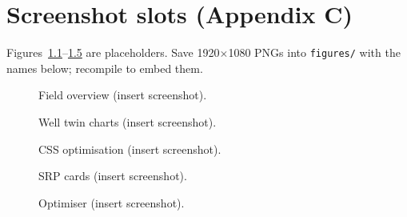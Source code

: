 \documentclass[12pt,a4paper]{report}
\begin{document}
\chapter{Screenshot slots (Appendix C)}
Figures~\ref{fig:map}--\ref{fig:pareto} are placeholders. Save 1920$\times$1080
PNGs into \texttt{figures/} with the names below; recompile to embed them.
\begin{figure}[h]\centering
{}
\caption{Field overview (insert screenshot).}\label{fig:map}\end{figure}
\begin{figure}[h]\centering
{}
\caption{Well twin charts (insert screenshot).}\label{fig:ipr}\end{figure}
\begin{figure}[h]\centering
{}
\caption{CSS optimisation (insert screenshot).}\label{fig:css}\end{figure}
\begin{figure}[h]\centering
{}
\caption{SRP cards (insert screenshot).}\label{fig:cards}\end{figure}
\begin{figure}[h]\centering
{}
\caption{Optimiser (insert screenshot).}\label{fig:pareto}\end{figure}
\end{document}
